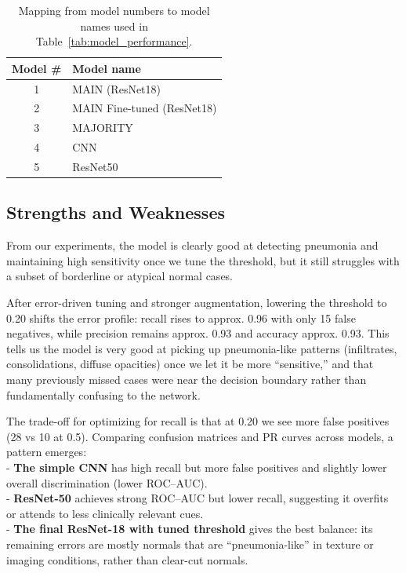 \documentclass[11pt]{article}
\begin{document}
\begin{table}[h]
\centering
\small
\begin{tabular}{cl}
\hline
\textbf{Model \#} & \textbf{Model name} \\
\hline
1 & MAIN (ResNet18) \\
2 & MAIN Fine-tuned (ResNet18) \\
3 & MAJORITY \\
4 & CNN \\
5 & ResNet50 \\
\hline
\end{tabular}
\caption{Mapping from model numbers to model names used in Table~\ref{tab:model_performance}.}
\label{tab:model_name_mapping}
\end{table}



\subsection{Strengths and Weaknesses}
From our experiments, the model is clearly good at detecting pneumonia and maintaining high sensitivity once we tune the threshold, but it still struggles with a subset of borderline or atypical normal cases.

After error-driven tuning and stronger augmentation, lowering the threshold to 0.20 shifts the error profile: recall rises to approx. 0.96 with only 15 false negatives, while precision remains approx. 0.93 and accuracy approx. 0.93. This tells us the model is very good at picking up pneumonia-like patterns (infiltrates, consolidations, diffuse opacities) once we let it be more “sensitive,” and that many previously missed cases were near the decision boundary rather than fundamentally confusing to the network.

The trade-off for optimizing for recall is that at 0.20 we see more false positives (28 vs 10 at 0.5). Comparing confusion matrices and PR curves across models, a pattern emerges: \\
- \textbf{The simple CNN} has high recall but more false positives and slightly lower overall discrimination (lower ROC–AUC). \\
- \textbf{ResNet-50} achieves strong ROC–AUC but lower recall, suggesting it overfits or attends to less clinically relevant cues. \\
- \textbf{The final ResNet-18 with tuned threshold} gives the best balance: its remaining errors are mostly normals that are “pneumonia-like” in texture or imaging conditions, rather than clear-cut normals.
\end{document}
